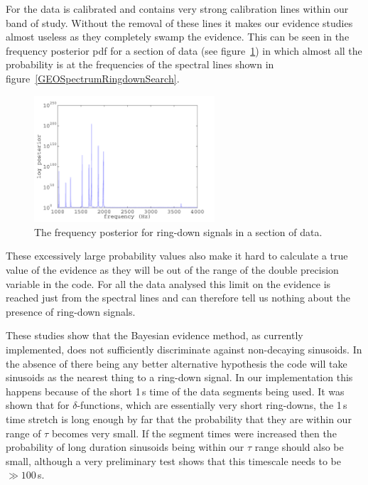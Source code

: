 For \geo the data is calibrated and contains very strong calibration lines within our band of
study. Without the removal of these lines it makes our evidence studies almost useless as they
completely swamp the evidence. This can be seen in the frequency posterior pdf for a section of
\geo data (see figure~\ref{GEORingdownPosterior}) in which almost all the probability is at the
frequencies of the spectral lines shown in figure~\ref{GEOSpectrumRingdownSearch}.
\begin{figure}[!htbp]
\begin{center}
\includegraphics[width=0.6\textwidth]{figs/GEORingdownPosterior}\caption{ The frequency posterior
for ring-down signals in a section of \geo data.}\label{GEORingdownPosterior}
\end{center}
\end{figure}
These excessively large probability values also make it hard to calculate a true value of the
evidence as they will be out of the range of the double precision variable in the code. For all the
\geo data analysed this limit on the evidence is reached just from the spectral lines and can
therefore tell us nothing about the presence of ring-down signals.

These studies show that the Bayesian evidence method, as currently implemented, does not
sufficiently discriminate against non-decaying sinusoids. In the absence of there being any
better alternative hypothesis the code will take sinusoids as the nearest thing to a ring-down
signal. In our implementation this happens because of the short 1\,s time of the data segments
being used. It was shown that for $\delta$-functions, which are essentially very short ring-downs,
the 1\,s time stretch is long enough by far that the probability that they are within our range of
$\tau$ becomes very small. If the segment times were increased then the probability of long duration
sinusoids being within our $\tau$ range should also be small, although a very preliminary test shows
that this timescale needs to be $\gg 100$\,s.

